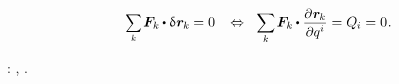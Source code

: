 \nopagebreak\vspace{-0.1em}
\begin{equation}\label{statics.discrete:principleofvirtualwork}
\scalebox{.8}[.9]{$ \displaystyle \sum_{\smash{k}} $} \hspace{.25ex}
\bm{F}_k \hspace{-0.1ex} \dotp \variation{\hspace{.1ex}\locationvector_{\hspace{-0.1ex}k}} \hspace{-0.1ex} = 0
\hspace{.8em} \Leftrightarrow \hspace{.6em}
\scalebox{.92}[.96]{$ \displaystyle \sum_{\smash{k}} $} \hspace{.25ex}
\bm{F}_k \hspace{-0.1ex} \dotp \scalebox{.96}{$ \displaystyle \frac{\raisemath{-0.1ex}{\partial \hspace{.1ex} \locationvector_{\hspace{-0.1ex}k}}}{\raisemath{-0.1ex}{\partial q^i}} $}
= Q_{\hspace{-0.1ex}i} = 0
\hspace{.1ex} .
\vspace{-0.1em}\end{equation}

\vspace{-0.2em}\noindent
{}
\::
,
.

